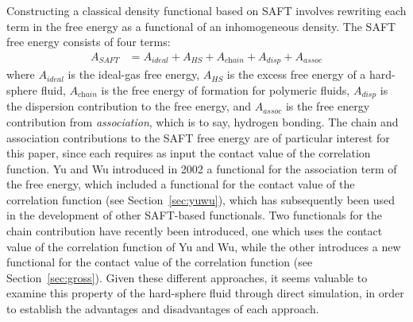 \documentclass[letterpaper,twocolumn,amsmath,amssymb,jcp,10pt,aip]{revtex4-1}
\begin{document}
Constructing a classical density functional based on SAFT involves
rewriting each term in the free energy as a functional of an
inhomogeneous density.  The SAFT free energy consists of four terms:
\begin{align}
  A_\textit{SAFT} &= A_\textit{ideal} + A_\textit{HS} + A_\textit{chain} + A_\textit{disp} + A_\textit{assoc}
\end{align}
where $A_\textit{ideal}$ is the ideal-gas free energy, $A_\textit{HS}$
is the excess free energy of a hard-sphere fluid, $A_\textit{chain}$
is the free energy of formation for polymeric fluids,
$A_\textit{disp}$ is the dispersion contribution to the free energy,
and $A_\textit{assoc}$ is the free energy contribution from
\emph{association}, which is to say, hydrogen bonding.  The chain and
association contributions to the SAFT free energy are of particular
interest for this paper, since each requires as input the contact
value of the correlation function.
%
Yu and Wu introduced in 2002 a functional for the association term of
the free energy, which included a functional for the contact value of
the correlation function (see
Section~\ref{sec:yuwu})\cite{yu2002fmt-dft-inhomogeneous-associating},
which has subsequently been used in the development of other
SAFT-based functionals\cite{fu2005vapor-liquid-dft, bryk2006density}.
Two functionals for the chain contribution have recently been
introduced\cite{bryk2006density, gross2009density}, one which uses the
contact value of the correlation function of Yu and
Wu\cite{bryk2006density}, while the other introduces a new functional
for the contact value of the correlation
function (see Section~\ref{sec:gross})\cite{gross2009density}.
Given these different approaches, it seems valuable to examine this
property of the hard-sphere fluid through direct simulation, in order
to establish the advantages and disadvantages of each approach.
\end{document}
